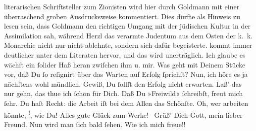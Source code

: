 \begin{ledgroupsized}[t]{13cm}
{{{                  literarischen Schriftsteller zum Zionisten wird hier durch Goldmann mit einer überraschend groben Ausdrucksweise
                  kommentiert. Dies dürfte als Hinweis zu lesen sein, dass Goldmann den richtigen Umgang mit der jüdischen Kultur in
                  der Assimilation sah, während Herzl das
                  verarmte Judentum aus dem Osten der k. k. Monarchie nicht nur nicht ablehnte,
                  sondern sich dafür begeisterte.}}}\label{K_L02742-55h} kommt immer deutlicher \strikeout{\textcolor{gray}{ut}} unter dem Literaten hervor, und das wird unerträglich. Ich glaube es wächſt
               ein  ſolider Haß heran zwiſchen ihm u. mir.\pend
           \pstart
           Was geht mit Deinem Stücke vor, daß Du ſo reſignirt über das {\pb}Warten auf Erfolg ſprichſt? Nun, ich höre es ja nächſtens wohl mündlich. Gewiß, Du
               ſollſt den Erfolg nicht erwarten. Laß’  das nur
               gehn, das thue ich ſchon für Dich.\pend
           \pstart
           Daß Du »Freiwild« ſchreibſt, freut mich ſehr. Du
               haſt Recht: die Arbeit iſt bei dem Allen das Schönſte. Oh, wer arbeiten könnte, \substVorne{}\textsuperscript{!}\substDazwischen{},\substHinten{} wie Du! Alles gute Glück {\pb}zum Werke! {\dotsfour}\pend
           \pstart
           Grüß’ Dich Gott, mein lieber Freund. Nun wird man ſich bald ſehen. Wie ich mich
                  freue!! {\dotstwo}\pend

\end{ledgroupsized}
